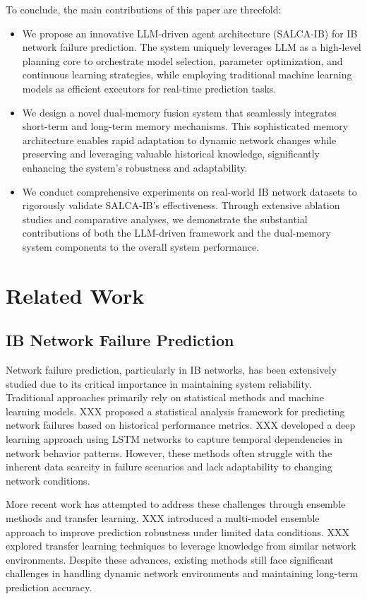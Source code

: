 \documentclass[conference]{IEEEtran}
\begin{document}
To conclude, the main contributions of this paper are threefold:
\begin{itemize}
	\item We propose an innovative LLM-driven agent architecture (SALCA-IB) for IB network failure prediction. The system uniquely leverages LLM as a high-level planning core to orchestrate model selection, parameter optimization, and continuous learning strategies, while employing traditional machine learning models as efficient executors for real-time prediction tasks.
	\item We design a novel dual-memory fusion system that seamlessly integrates short-term and long-term memory mechanisms. This sophisticated memory architecture enables rapid adaptation to dynamic network changes while preserving and leveraging valuable historical knowledge, significantly enhancing the system's robustness and adaptability.
	\item We conduct comprehensive experiments on real-world IB network datasets to rigorously validate SALCA-IB's effectiveness. Through extensive ablation studies and comparative analyses, we demonstrate the substantial contributions of both the LLM-driven framework and the dual-memory system components to the overall system performance.
\end{itemize}

\section{Related Work}

\subsection{IB Network Failure Prediction}

Network failure prediction, particularly in IB networks, has been extensively studied due to its critical importance in maintaining system reliability. Traditional approaches primarily rely on statistical methods and machine learning models. XXX proposed a statistical analysis framework for predicting network failures based on historical performance metrics. XXX developed a deep learning approach using LSTM networks to capture temporal dependencies in network behavior patterns. However, these methods often struggle with the inherent data scarcity in failure scenarios and lack adaptability to changing network conditions.
	
More recent work has attempted to address these challenges through ensemble methods and transfer learning. XXX introduced a multi-model ensemble approach to improve prediction robustness under limited data conditions. XXX explored transfer learning techniques to leverage knowledge from similar network environments. Despite these advances, existing methods still face significant challenges in handling dynamic network environments and maintaining long-term prediction accuracy.
\end{document}
